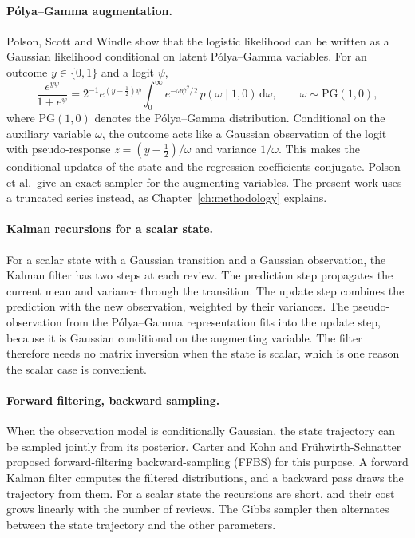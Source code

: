 \paragraph{P\'olya--Gamma augmentation.}
Polson, Scott and Windle \cite{polson2013pg} show that the logistic likelihood can be written as a
Gaussian likelihood conditional on latent P\'olya--Gamma variables. For an outcome $y \in \{0,1\}$ and
a logit $\psi$,
\begin{equation}
  \frac{e^{y\psi}}{1 + e^{\psi}}
  = 2^{-1} e^{(y - \tfrac{1}{2})\psi}
    \int_0^\infty e^{-\omega\psi^2/2}\, p(\omega \mid 1, 0)\,\mathrm{d}\omega,
  \qquad \omega \sim \mathrm{PG}(1, 0),
  \label{eq:pg}
\end{equation}
where $\mathrm{PG}(1, 0)$ denotes the P\'olya--Gamma distribution. Conditional on the auxiliary variable
$\omega$, the outcome acts like a Gaussian observation of the logit with pseudo-response
$z = (y - \tfrac{1}{2})/\omega$ and variance $1/\omega$. This makes the conditional updates of the state
and the regression coefficients conjugate. Polson et al.\ give an exact sampler for the augmenting
variables. The present work uses a truncated series instead, as Chapter~\ref{ch:methodology} explains.

\paragraph{Kalman recursions for a scalar state.}
For a scalar state with a Gaussian transition and a Gaussian observation, the Kalman filter has two steps at
each review. The prediction step propagates the current mean and variance through the transition. The update
step combines the prediction with the new observation, weighted by their variances. The pseudo-observation from
the P\'olya--Gamma representation fits into the update step, because it is Gaussian conditional on the augmenting
variable. The filter therefore needs no matrix inversion when the state is scalar, which is one reason the
scalar case is convenient.

\paragraph{Forward filtering, backward sampling.}
When the observation model is conditionally Gaussian, the state trajectory can be sampled jointly from
its posterior. Carter and Kohn \cite{carter1994gibbs} and Fr\"uhwirth-Schnatter \cite{fruhwirth1994data}
proposed forward-filtering backward-sampling (FFBS) for this purpose. A forward Kalman filter computes the
filtered distributions, and a backward pass draws the trajectory from them. For a scalar state the
recursions are short, and their cost grows linearly with the number of reviews. The Gibbs sampler then
alternates between the state trajectory and the other parameters.

